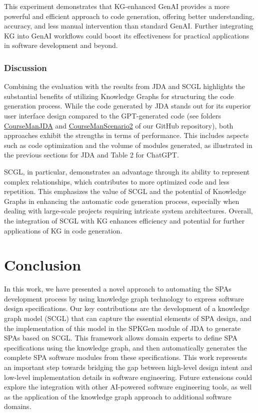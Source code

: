 \documentclass[runningheads]{llncs}
\begin{document}
This experiment demonstrates that KG-enhanced GenAI provides a more powerful and efficient approach to code generation, offering better understanding, accuracy, and less manual intervention than standard GenAI. Further integrating KG into GenAI workflows could boost its effectiveness for practical applications in software development and beyond.

\subsubsection{Discussion}

Combining the evaluation with the results from JDA and SCGL highlights the substantial benefits of utilizing Knowledge Graphs for structuring the code generation process. While the code generated by JDA stands out for its superior user interface design compared to the GPT-generated code (see folders \href{https://github.com/jdomainapp/doc-scgl-soict2024/tree/main/CourseManJDA}{CourseManJDA} and \href{https://github.com/jdomainapp/doc-scgl-soict2024/tree/main/CourseManScenario2}{CourseManScenario2} of our GitHub repository), both approaches exhibit the strengths in terms of performance. This includes aspects such as code optimization and the volume of modules generated, as illustrated in the previous sections for JDA and Table 2 for ChatGPT.

SCGL, in particular, demonstrates an advantage through its ability to represent complex relationships, which contributes to more optimized code and less repetition. This emphasizes the value of SCGL and the potential of Knowledge Graphs in enhancing the automatic code generation process, especially when dealing with large-scale projects requiring intricate system architectures. Overall, the integration of SCGL with KG enhances efficiency and potential for further applications of KG in code generation.

\section{Conclusion} \label{section6}
\vspace{-0.3cm}
In this work, we have presented a novel approach to automating the SPAs development process by using knowledge graph technology to express software design specifications. Our key contributions are the development of a knowledge graph model (SCGL) that can capture the essential elements of SPA design, and the implementation of this model in the SPKGen module of JDA to generate SPAs based on SCGL. This framework allows domain experts to define SPA specifications using the knowledge graph, and then automatically generates the complete SPA software modules from these specifications. This work represents an important step towards bridging the gap between high-level design intent and low-level implementation details in software engineering. Future extensions could explore the integration with other AI-powered software engineering tools, as well as the application of the knowledge graph approach to additional software domains.



\end{document}
